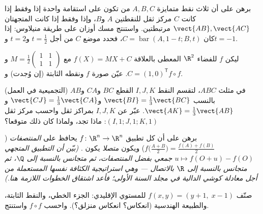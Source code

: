 \begin{exercise}[$\star$]\label{exo:b2:affine:2}
برهن على أن ثلاث نقط متمايزة $A, B, C$ من  تكون على استقامة
واحدة إذا وفقط إذا كانت $C$ مركز ثقل للنقطتين $A$ و$B$، وإذا
وفقط إذا كانت المتجهتان $\vect{AB}, \vect{AC}$ مرتبطتين. واستنتج مسك أوزان على طريقة
منيلاوس: إذا كان $C = \operatorname{bar}(A, 1 - t; B, t)$، فحدد موضع $C$ من أجل $t = \frac12$ و$t = 2$
و$t = -1$.
\end{exercise}

\begin{exercise}[$\star$]\label{exo:b2:affine:3}
ليكن $f$  للفضاء $\R^2$ المعطى بالعلاقة $f(X) = MX + C$
مع $M = \frac12\begin{pmatrix} 1 & 1\\ 1 & 1\end{pmatrix}$ و$C =
(1, 0)^{\mathsf T}$. عيّن صورة $f$ ونقطه الثابتة (إن وُجدت)
و$f \circ f$.
\end{exercise}

\begin{exercise}[$\star\star$]\label{exo:b2:affine:4}
(التجميعية في العمل) في مثلث $ABC$، لتقسم النقط $I, J, K$ القطع
$BC$ و$CA$ و$AB$ بالنسب $\vect{BI} = \frac13\vect{BC}$ و$\vect{CJ} = \frac13\vect{CA}$ و$\vect{AK} = \frac13\vect{AB}$.
عبّر عن $I, J, K$ بمراكز ثقل واحسب مركز ثقل $(I,1;J,1;K,1)$: ماذا تجد، ولماذا
كان ذلك متوقعا؟
\end{exercise}

\begin{exercise}[$\star\star$]\label{exo:b2:affine:5}
برهن على أن كل تطبيق $f \colon \R^n \to \R^n$ يحافظ على \emph{المنتصفات} ($f\bigl(\frac{A+B}{2}\bigr) = \frac{f(A) + f(B)}{2}$)
ويكون \emph{متصلا} يكون . \emph{(بيّن أن التطبيق المتجهي
$u \mapsto
f(O + u) - f(O)$ جمعي بفضل المنتصفات، ثم متجانس بالنسبة إلى $\Q$، ثم متجانس
بالنسبة إلى $\R$ بالاتصال --- وهي استراتيجية الكثافة نفسها
المستعملة من أجل معادلة كوشي الدالية في مجلد السنة الأولى؛ فأعد
اشتقاق الخطوات اللازمة هنا.)}
\end{exercise}

\begin{exercise}[$\star\star$]\label{exo:b2:affine:6}
صنّف  $f(x, y) = (y + 1,\; x - 1)$ للمستوي الإقليدي: الجزء الخطي، والنقط
الثابتة، والطبيعة الهندسية (انعكاس؟ انعكاس منزلق؟). واحسب $f \circ f$
واستنتج.
\end{exercise}

